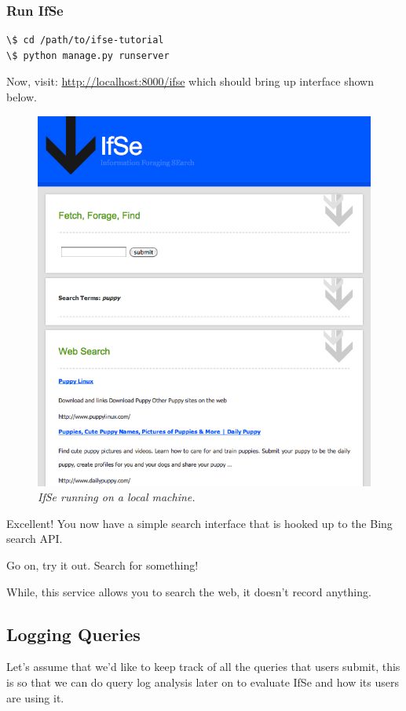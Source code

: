 \documentclass[letterpaper,10pt,english]{sphinxmanual}
\begin{document}
\subsubsection{Run IfSe}
\label{ifse-tutorial:run-ifse}
\begin{Verbatim}[commandchars=\\\{\}]
\$ cd /path/to/ifse-tutorial
\$ python manage.py runserver
\end{Verbatim}

Now, visit: \href{http://localhost:8000/ifse}{http://localhost:8000/ifse} which should bring up interface shown below.
\begin{figure}[htbp]
\centering
\capstart

\includegraphics{puppy-ifse-before.png}
\caption{\emph{IfSe running on a local machine.}}\end{figure}

Excellent! You now have a simple search interface that is hooked up to the Bing search API.

Go on, try it out. Search for something!

While, this service allows you to search the web, it doesn't record anything.


\subsection{Logging Queries}
\label{ifse-tutorial:logging-queries}
Let's assume that we'd like to keep track of all the queries that users submit, this is so that we can do query log analysis later on to evaluate IfSe and how its users are using it.
\end{document}
